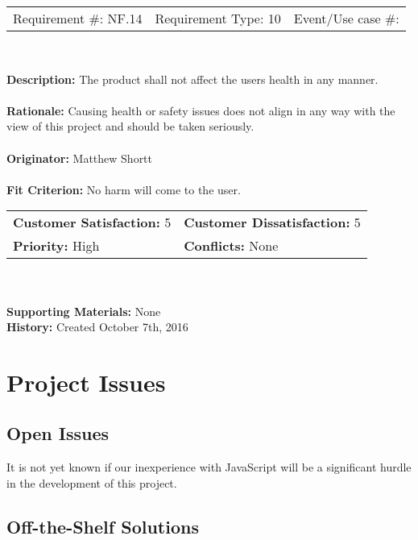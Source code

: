 \documentclass[12pt, titlepage]{article}
\begin{document}
\begin{framed}
	
	\begin{center}
		
		\begin{tabular}{ l c r }
			Requirement \#: NF.14 & Requirement Type: 10 & Event/Use case \#: \\
		\end{tabular} \\
	\end{center}
	\textbf{Description:} The product shall not affect the users health in any manner.\\
	\\
	\textbf{Rationale:} Causing health or safety issues does not align in any way with the 
	view of this project and should be taken seriously.  \\
	\\
	\textbf{Originator:} Matthew Shortt \\
	\\
	\textbf{Fit Criterion:} No harm will come to the user. 
	\\
	
	\begin{tabular}{ll}
		\textbf{Customer Satisfaction:} 5 & \textbf{Customer Dissatisfaction:} 5 \\
		\textbf{Priority:} High & \textbf{Conflicts:} None\\
	\end{tabular} \\
	\\
	\textbf{Supporting Materials:} None \\
	\textbf{History:} Created October 7th, 2016
	
\end{framed}

\section{Project Issues}

\subsection{Open Issues}
It is not yet known if our inexperience with JavaScript will be a significant hurdle in the development of this project.

\subsection{Off-the-Shelf Solutions}
\end{document}
